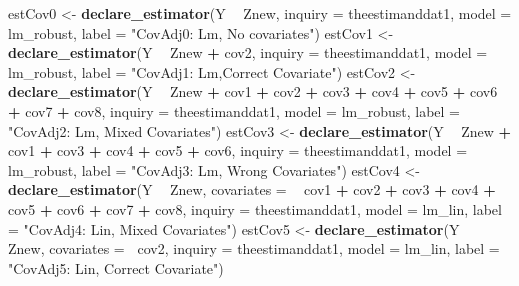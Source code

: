 \documentclass[
  12pt,
]{book}
\newenvironment{Shaded}{\begin{snugshade}}{\end{snugshade}}
\newcommand{\DataTypeTok}[1]{\textcolor[rgb]{0.13,0.29,0.53}{#1}}
\newcommand{\KeywordTok}[1]{\textcolor[rgb]{0.13,0.29,0.53}{\textbf{#1}}}
\newcommand{\NormalTok}[1]{#1}
\newcommand{\OperatorTok}[1]{\textcolor[rgb]{0.81,0.36,0.00}{\textbf{#1}}}
\newcommand{\StringTok}[1]{\textcolor[rgb]{0.31,0.60,0.02}{#1}}
\theoremstyle{definition}
\theoremstyle{definition}
\theoremstyle{definition}
\theoremstyle{remark}
\begin{document}
\begin{Shaded}
\begin{Highlighting}[]
\NormalTok{estCov0 <-}\StringTok{ }\KeywordTok{declare_estimator}\NormalTok{(Y }\OperatorTok{~}\StringTok{ }\NormalTok{Znew, }\DataTypeTok{inquiry =}\NormalTok{ theestimanddat1, }\DataTypeTok{model =}\NormalTok{ lm_robust, }\DataTypeTok{label =} \StringTok{"CovAdj0: Lm, No covariates"}\NormalTok{)}
\NormalTok{estCov1 <-}\StringTok{ }\KeywordTok{declare_estimator}\NormalTok{(Y }\OperatorTok{~}\StringTok{ }\NormalTok{Znew }\OperatorTok{+}\StringTok{ }\NormalTok{cov2, }\DataTypeTok{inquiry =}\NormalTok{ theestimanddat1, }\DataTypeTok{model =}\NormalTok{ lm_robust, }\DataTypeTok{label =} \StringTok{"CovAdj1: Lm,Correct Covariate"}\NormalTok{)}
\NormalTok{estCov2 <-}\StringTok{ }\KeywordTok{declare_estimator}\NormalTok{(Y }\OperatorTok{~}\StringTok{ }\NormalTok{Znew }\OperatorTok{+}\StringTok{ }\NormalTok{cov1 }\OperatorTok{+}\StringTok{ }\NormalTok{cov2 }\OperatorTok{+}\StringTok{ }\NormalTok{cov3 }\OperatorTok{+}\StringTok{ }\NormalTok{cov4 }\OperatorTok{+}\StringTok{ }\NormalTok{cov5 }\OperatorTok{+}\StringTok{ }\NormalTok{cov6 }\OperatorTok{+}\StringTok{ }\NormalTok{cov7 }\OperatorTok{+}\StringTok{ }\NormalTok{cov8, }\DataTypeTok{inquiry =}\NormalTok{ theestimanddat1, }\DataTypeTok{model =}\NormalTok{ lm_robust, }\DataTypeTok{label =} \StringTok{"CovAdj2: Lm,  Mixed Covariates"}\NormalTok{)}
\NormalTok{estCov3 <-}\StringTok{ }\KeywordTok{declare_estimator}\NormalTok{(Y }\OperatorTok{~}\StringTok{ }\NormalTok{Znew }\OperatorTok{+}\StringTok{ }\NormalTok{cov1 }\OperatorTok{+}\StringTok{ }\NormalTok{cov3 }\OperatorTok{+}\StringTok{ }\NormalTok{cov4 }\OperatorTok{+}\StringTok{ }\NormalTok{cov5 }\OperatorTok{+}\StringTok{ }\NormalTok{cov6, }\DataTypeTok{inquiry =}\NormalTok{ theestimanddat1, }\DataTypeTok{model =}\NormalTok{ lm_robust, }\DataTypeTok{label =} \StringTok{"CovAdj3: Lm, Wrong Covariates"}\NormalTok{)}
\NormalTok{estCov4 <-}\StringTok{ }\KeywordTok{declare_estimator}\NormalTok{(Y }\OperatorTok{~}\StringTok{ }\NormalTok{Znew, }\DataTypeTok{covariates =} \OperatorTok{~}\StringTok{ }\NormalTok{cov1 }\OperatorTok{+}\StringTok{ }\NormalTok{cov2 }\OperatorTok{+}\StringTok{ }\NormalTok{cov3 }\OperatorTok{+}\StringTok{ }\NormalTok{cov4 }\OperatorTok{+}\StringTok{ }\NormalTok{cov5 }\OperatorTok{+}\StringTok{ }\NormalTok{cov6 }\OperatorTok{+}\StringTok{ }\NormalTok{cov7 }\OperatorTok{+}\StringTok{ }\NormalTok{cov8, }\DataTypeTok{inquiry =}\NormalTok{ theestimanddat1, }\DataTypeTok{model =}\NormalTok{ lm_lin, }\DataTypeTok{label =} \StringTok{"CovAdj4: Lin, Mixed Covariates"}\NormalTok{)}
\NormalTok{estCov5 <-}\StringTok{ }\KeywordTok{declare_estimator}\NormalTok{(Y }\OperatorTok{~}\StringTok{ }\NormalTok{Znew, }\DataTypeTok{covariates =} \OperatorTok{~}\NormalTok{cov2, }\DataTypeTok{inquiry =}\NormalTok{ theestimanddat1, }\DataTypeTok{model =}\NormalTok{ lm_lin, }\DataTypeTok{label =} \StringTok{"CovAdj5: Lin, Correct Covariate"}\NormalTok{)}
\end{Highlighting}
\end{Shaded}
\end{document}
